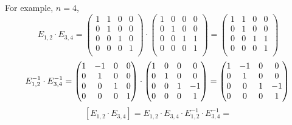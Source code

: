 \documentclass[12pt]{article}
\begin{document}
For example, \( n=4 \), \newline
$$ E_{1,2} \cdot E_{3,4}=\begin{pmatrix} 
	1 & 1 & 0 & 0 \\
	0 & 1 & 0 & 0 \\
	0 & 0 & 1 & 0 \\
	0 & 0 & 0 & 1 \\
	\end{pmatrix} \cdot \begin{pmatrix} 
	1 & 0 & 0 & 0 \\
	0 & 1 & 0 & 0 \\
	0 & 0 & 1 & 1 \\
	0 & 0 & 0 & 1 \\
	\end{pmatrix}=\begin{pmatrix} 
	1 & 1 & 0 & 0 \\
	0 & 1 & 0 & 0 \\
	0 & 0 & 1 & 1 \\
	0 & 0 & 0 & 1 \\
	\end{pmatrix} $$
$$  E_{1,2}^{-1} \cdot E_{3,4}^{-1}=\begin{pmatrix} 
	1 & -1 & 0 & 0 \\
	0 & 1 & 0 & 0 \\
	0 & 0 & 1 & 0 \\
	0 & 0 & 0 & 1 \\
	\end{pmatrix} \cdot \begin{pmatrix} 
	1 & 0 & 0 & 0 \\
	0 & 1 & 0 & 0 \\
	0 & 0 & 1 & -1 \\
	0 & 0 & 0 & 1 \\
	\end{pmatrix}=\begin{pmatrix} 
	1 & -1 & 0 & 0 \\
	0 & 1 & 0 & 0 \\
	0 & 0 & 1 & -1 \\
	0 & 0 & 0 & 1 \\
	\end{pmatrix} \newline
$$
$$  [E_{1,2} \cdot E_{3,4}]=E_{1,2} \cdot E_{3,4} \cdot E_{1,2}^{-1} \cdot E_{3,4}^{-1}=$$
\end{document}
